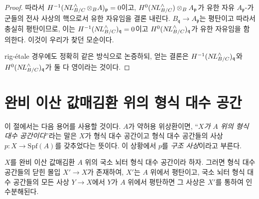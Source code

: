 \begin{proof}
\noindent
따라서
$H^{-1}(\mathop{N\!L}\nolimits_{B/C}^\wedge \otimes_B A)_\mathfrak p \allowbreak= 0$이고,
$H^0(\mathop{N\!L}\nolimits_{B/C}^\wedge) \otimes_B A_\mathfrak p$가
유한 자유
$A_\mathfrak p$-가군들의 전사 사상의 핵으로서 유한 자유임을 결론 내린다.
$B_\mathfrak q \to A_\mathfrak p$는 평탄이고 따라서 충실히 평탄이므로,
이는 $H^{-1}(\mathop{N\!L}\nolimits_{B/C}^\wedge)_\mathfrak q = 0$이고
$H^0(\mathop{N\!L}\nolimits_{B/C}^\wedge)_\mathfrak q$가 유한 자유임을 함의한다.
이것이 우리가 찾던 모순이다.

\medskip\noindent
rig-\'etale 경우에도 정확히 같은 방식으로 논증하되, 얻는 결론은
$H^{-1}(\mathop{N\!L}\nolimits_{B/C}^\wedge)_\mathfrak q$와
$H^0(\mathop{N\!L}\nolimits_{B/C}^\wedge)_\mathfrak q$가 둘 다 영이라는 것이다.
\end{proof}


\section{완비 이산 값매김환 위의 형식 대수 공간}
\label{section-over-cdrv}

\noindent
이 절에서는 다음 용어를 사용할 것이다. $A$가 약허용 위상환이면,
``{\it $X$가 $A$ 위의 형식 대수 공간이다}''라는 말은 $X$가 형식 대수
공간이고 형식 대수 공간들의 사상 $p : X \to \text{Spf}(A)$를 갖추었다는
뜻이다. 이 상황에서 $p$를 {\it 구조 사상}이라고 부른다.

\begin{lemma}
\label{lemma-flat-locus}
$X$를 완비 이산 값매김환 $A$ 위의 국소 뇌터 형식 대수 공간이라 하자.
그러면 형식 대수 공간들의 닫힌 몰입 $X' \to X$가 존재하여,
$X'$는 $A$ 위에서 평탄이고, 국소 뇌터 형식 대수 공간들의 모든 사상
$Y \to X$에서 $Y$가 $A$ 위에서 평탄하면 그 사상은 $X'$를 통하여
인수분해된다.
\end{lemma}

